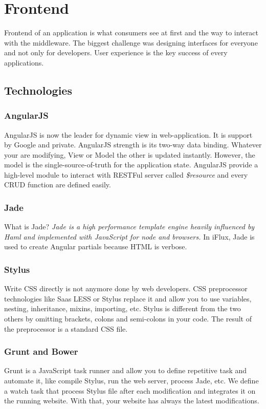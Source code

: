 \section{Frontend}

Frontend of an application is what consumers see at first and the way to interact with the middleware. The biggest challenge was designing interfaces for everyone and not only for developers. User experience is the key success of every applications. 

\subsection{Technologies}


\subsubsection{AngularJS}

AngularJS is now the leader for dynamic view in web-application. It is support by Google and private. AngularJS strength is its two-way data binding. Whatever your are modifying, View or Model the other is updated instantly. However, the model is the single-source-of-truth for the application state.  AngularJS provide a high-level module to interact with RESTFul server called \emph{\$resource} and every CRUD function are defined easily. 

\subsubsection{Jade}
What is Jade? \emph{Jade is a high performance template engine heavily influenced by Haml and implemented with JavaScript for node and browsers.} In iFlux, Jade is used to create Angular partials because HTML is verbose. 


\subsubsection{Stylus}

Write CSS directly is not anymore done by web developers. CSS preprocessor technologies like Saas LESS or Stylus replace it and allow you to use variables, nesting, inheritance, mixins, importing, etc. Stylus is different from the two others by omitting brackets, colons and semi-colons in your code. The result of the preprocessor is a standard CSS file. 

\subsubsection{Grunt and Bower}
Grunt is a JavaScript task runner and allow you to define repetitive task and automate it, like compile Stylus, run the web server, process Jade, etc. We define a watch task that process Stylus file after each modification and integrates it on the running website. With that, your website has always the latest modifications. 

